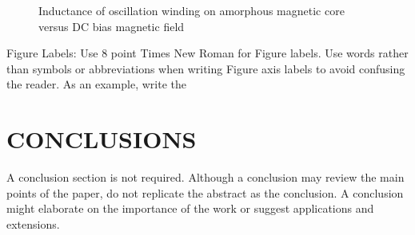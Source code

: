\documentclass[letterpaper, 10 pt, conference]{ieeeconf}  %
\begin{document}
   \begin{figure}[thpb]
      \centering
      \caption{Inductance of oscillation winding on amorphous
       magnetic core versus DC bias magnetic field}
      \label{figurelabel}
   \end{figure}
   

Figure Labels: Use 8 point Times New Roman for Figure labels. Use words rather than symbols or abbreviations when writing Figure axis labels to avoid confusing the reader. As an example, write the 

\section{CONCLUSIONS}

A conclusion section is not required. Although a conclusion may review the main points of the paper, do not replicate the abstract as the conclusion. A conclusion might elaborate on the importance of the work or suggest applications and extensions. 

\addtolength{\textheight}{-12cm}   %



\end{document}
